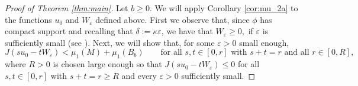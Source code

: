 \documentclass[reqno,11pt,oneside]{amsart}
\numberwithin{equation}{section}
\def\eps{\varepsilon}
\begin{document}
\begin{proof}[Proof of Theorem \ref{thm:main}]
Let $b\geq 0$. We will apply Corollary \ref{cor:mu_2a} to the functions $u_0$ and $W_\eps$ defined above. First we observe that, since $\phi$ has compact support and recalling that $\delta:=\kappa\eps$, we have that $W_\eps\ge0,$ if $\eps$ is sufficiently small (see \cite[p. 822]{hl}). Next, we will show that, for some $\eps>0$ small enough,
\begin{equation}\label{eq:claim 1}
J(su_0-tW_\eps)<\mu_1(M)+\mu_1(B_b)\qquad\text{for all \ }s,t\in[0,r] \text{ with } s+t=r\text{ \ and all \ }r\in[0,R],
\end{equation}
where $R>0$ is chosen large enough so that $J(su_0-tW_\eps)\leq 0$ for all $s,t\in[0,r]$ with  $s+t=r\geq R$ and every $\eps>0$ sufficiently small.


\end{proof}
\end{document}
